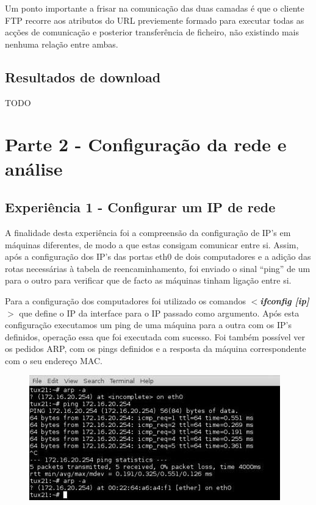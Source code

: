 \documentclass[a4paper]{article}
\begin{document}
Um ponto importante a frisar na comunicação das duas camadas é que o cliente FTP recorre aos atributos do URL previemente formado para executar todas as acções de comunicação e posterior transferência de ficheiro, não existindo mais nenhuma relação entre ambas.

\subsection{Resultados de download}
TODO

\section{Parte 2 - Configuração da rede e análise}
\subsection{Experiência 1 - Configurar um IP de rede}
A finalidade desta experiência foi a compreensão da configuração de IP’s em máquinas diferentes, de modo a que estas consigam comunicar entre si. Assim, após a configuração dos IP’s das portas eth0 de dois computadores e a adição das rotas necessárias à tabela de reencaminhamento, foi enviado o sinal “ping” de um para o outro para verificar que de facto as máquinas tinham ligação entre si.

Para a configuração dos computadores foi utilizado os comandos \textbf{\textit{$<$ifconfig [ip]$>$}} que define o IP da interface para o IP passado como argumento. Após esta configuração executamos um ping de uma máquina para a outra com os IP’s definidos, operação essa que foi executada com sucesso. Foi também possível ver os pedidos ARP, com os pings definidos e a resposta da máquina correspondente com o seu endereço MAC.

\begin{figure}[h!]
\centering
\includegraphics[scale=0.5]{res/image1.jpg}
\end{figure}
\end{document}
